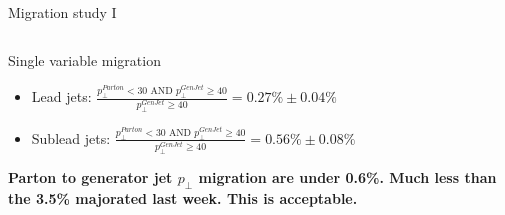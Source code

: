 \documentclass[8pt]{beamer}
\begin{document}
\begin{frame}{Migration study I}
\begin{columns}
\end{columns}

\begin{block}{Single variable migration}
  
\begin{itemize}
  \item \tiny{Lead jets:    $\frac{p_{\perp}^{Parton}<30 \text{ AND } p_{\perp}^{GenJet} \geq 40}{p_{\perp}^{GenJet} \geq 40}=0.27\% \pm 0.04\%$  }
  \item \tiny{Sublead jets: $\frac{p_{\perp}^{Parton}<30 \text{ AND } p_{\perp}^{GenJet} \geq 40}{p_{\perp}^{GenJet} \geq 40}=0.56\% \pm 0.08\%$  }
\end{itemize}

\end{block}

\begin{center}
\textbf{Parton to generator jet $p_\perp$ migration are under 0.6\%. Much less than the 3.5\% majorated last week. This is acceptable.}
\end{center}

\end{frame}
\end{document}
